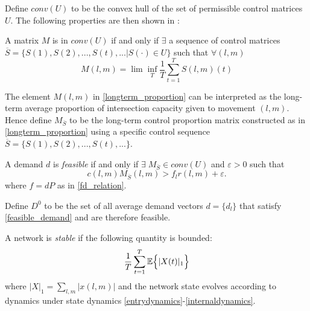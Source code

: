 Define $conv(U)$ to be the convex hull of the set of permissible control matrices $U$. The following properties are then shown in \cite{Varaiya2013}: 
\begin{Prop} A matrix 
$M$ is in $conv(U)$ if and only if $\exists$ a sequence of control matrices $\overline S = \{S(1),S(2),...,S(t),... \vert S(\cdot) \in U\}$ such that $\forall (l,m)$
\begin{equation}\label{longterm_proportion}
M(l,m) = \lim\inf_{T}\dfrac{1}{T}\sum_{t=1}^{T}S(l,m)(t)
\end{equation}
\end{Prop}
The element $M(l,m)$ in \eqref{longterm_proportion} can be interpreted as the long-term average proportion of intersection capacity given to movement $(l,m)$. Hence define $M_{\overline{S}}$ to be the long-term control proportion matrix constructed as in \eqref{longterm_proportion} using a specific control sequence $\overline{S} = \{S(1),S(2),...,S(t),...\}$. 
\begin{Prop} \label{feasible_property}
A demand $d$ is \emph{feasible} if and only if  $\exists \; M_{\overline S} \in conv(U)$ and $ \varepsilon > 0$ such that
 \begin{equation}  \label{feasible_demand} 
 c(l,m)M_{\overline S}(l,m) > f_{l}r(l,m) + \varepsilon. 
 \end{equation}
 where $f = dP$ as in \eqref{fd_relation}. 
\end{Prop}
Define $D^0$ to be the set of all average demand vectors $d=\{d_l\}$ that satisfy \eqref{feasible_demand} and are therefore feasible.

A network is \emph{stable} if the following quantity is bounded:
\begin{equation} \label{stability_condition}
 \dfrac{1}{T}\sum_{t=1}^{T}\expectation{\vert X(t) \vert_{1}}
 \end{equation}
where $\vert X\vert_{1} = \sum_{l,m} \vert x(l,m)\vert$ and the network state evolves according to dynamics under state dynamics \eqref{entrydynamics}-\eqref{internaldynamics}.


